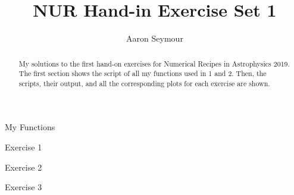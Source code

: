 \documentclass[a4paper,10pt]{article}
\title{NUR Hand-in Exercise Set 1}
\author{Aaron Seymour}
\begin{document}
\maketitle

\begin{abstract}
 My solutions to the first hand-on exercises for Numerical Recipes in Astrophysics 2019. The first section shows the script of all my functions used in 1 and 2. Then, the scripts, their output, and all the corresponding plots for each exercise are shown.
\end{abstract}


\begin{section}{My Functions}

\end{section}
\newpage

\begin{section}{Exercise 1}

\end{section}
\newpage

\begin{section}{Exercise 2}

\end{section}
\newpage

\begin{section}{Exercise 3}

\end{section}
\end{document}
